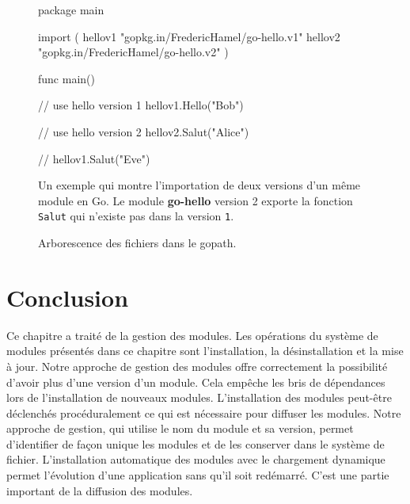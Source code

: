 \begin{figure}[ht]
\begin{mplisting}{1}
package main

import (
  hellov1 "gopkg.in/FredericHamel/go-hello.v1"
  hellov2 "gopkg.in/FredericHamel/go-hello.v2"
)

func main() {
  // use hello version 1
  hellov1.Hello("Bob")

  // use hello version 2
  hellov2.Salut("Alice")

  // hellov1.Salut("Eve")
}
\end{mplisting}
  \caption{Un exemple qui montre l'importation de deux versions d'un même module
    en Go. Le module \textbf{go-hello} version 2 exporte la fonction \texttt{Salut}
    qui n'existe pas dans la version \texttt{1}.}
\end{figure}


\begin{figure}[ht]
  \centering
  \lstset{frame=single}
  \caption{Arborescence des fichiers dans le gopath.}
  \label{fig:organisation_go}
\end{figure}

\section{Conclusion}
%
Ce chapitre a traité de la gestion des modules.  Les opérations du système de
modules présentés dans ce chapitre sont l'installation, la désinstallation et
la mise à jour.  Notre approche de gestion des modules offre correctement la
possibilité d'avoir plus d'une version d'un module. Cela empêche les bris de
dépendances lors de l'installation de nouveaux modules.  L'installation des
modules peut-être déclenchés procéduralement ce qui est nécessaire pour diffuser
les modules. Notre approche de gestion, qui utilise le nom du module et sa
version, permet d'identifier de façon unique les modules et de les conserver
dans le système de fichier. L'installation automatique des modules avec le
chargement dynamique permet l'évolution d'une application sans qu'il soit
redémarré. C'est une partie important de la diffusion des modules.

